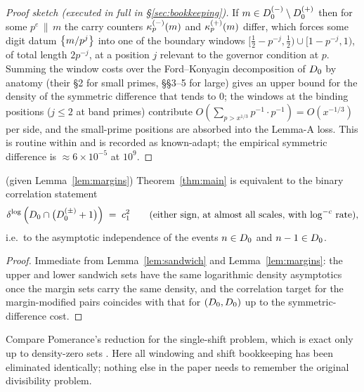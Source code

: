 \begin{proof}[Proof sketch (executed in full in
\S\ref{sec:bookkeeping})]
If $m\in D_0^{(-)}\setminus D_0^{(+)}$ then for some $p^e\,\|\,m$ the carry counters
$\kappa_p^{(-)}(m)$ and $\kappa_p^{(+)}(m)$ differ, which forces some digit datum
$\left\{m/p^j\right\}$ into one of the boundary windows
$[\tfrac12-p^{-j},\tfrac12)\cup[1-p^{-j},1)$, of total length $2p^{-j}$, at
a position $j$ relevant to the governor condition at $p$. Summing the
window costs over the Ford--Konyagin decomposition of $D_0$ by anatomy
(their \S2 for small primes, \S\S3--5 for large) gives an upper bound for
the density of the symmetric difference that tends to $0$; the windows at
the binding positions ($j\le2$ at band primes) contribute
$O(\sum_{p>x^{1/3}}p^{-1}\cdot p^{-1})=O(x^{-1/3})$ per side, and the
small-prime positions are absorbed into the Lemma-A loss. This is routine
within \cite{FK21} and is recorded as known-adapt; the empirical symmetric
difference is $\approx6\times10^{-5}$ at $10^9$.
\end{proof}

\begin{corollary}\label{cor:reduction}
\statusP{} (given Lemma~\ref{lem:margins})\quad
Theorem~\ref{thm:main} is equivalent to the binary correlation statement
\[
\operatorname{\delta^{\log}}\Big(D_0\cap\big(D_0^{(\pm)}+1\big)\Big)\;=\;c_1^2
\qquad\text{(either sign, at almost all scales, with $\log^{-c}$ rate),}
\]
i.e.\ to the asymptotic independence of the events $n\in D_0$ and
$n-1\in D_0$.
\end{corollary}

\begin{proof}
Immediate from Lemma~\ref{lem:sandwich} and Lemma~\ref{lem:margins}: the
upper and lower sandwich sets have the same logarithmic density
asymptotics once the margin sets carry the same density, and the
correlation target for the margin-modified pairs coincides with that for
$(D_0,D_0)$ up to the symmetric-difference cost.
\end{proof}

\begin{remark}
Compare Pomerance's reduction for the single-shift problem, which is exact
only up to density-zero sets \cite{Pom15}. Here all windowing and shift
bookkeeping has been eliminated identically; nothing else in the paper
needs to remember the original divisibility problem.
\end{remark}
